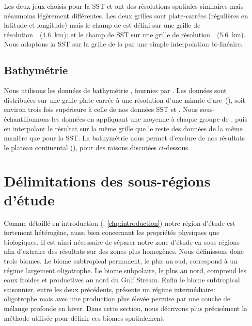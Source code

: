 Les deux jeux choisis pour la SST et  ont des résolutions spatiales similaires mais néanmoins légèrement différentes.
Les deux grilles sont plate-carrées (régulières en latitude et longitude) mais le champ de  est défini sur une grille  de résolution~~(\tapprox\qty{4.6}{\km}); et le champ de SST sur une grille  de résolution~~(\tapprox\qty{5.6}{\km}).
Nous adaptons la SST sur la grille de la  par une simple interpolation bi-linéaire.

\subsection{Bathymétrie}
\label{sec:donnees-bathymetrie}

Nous utilisons les données de bathymétrie , fournies par .
Les données sont distribuées sur une grille plate-carrée à une résolution d'une minute d'arc~(), soit environ trois fois supérieure à celle de nos données SST et .
Nous sous-échantillonnons les données en appliquant une moyenne à chaque groupe de , puis en interpolant le résultat sur la même grille que le reste des données de la même manière que pour la SST.
La bathymétrie nous permet d'exclure de nos résultats le plateau continental (), pour des raisons discutées ci-dessous.

\begin{figure}
  \centering
  \label{fig:bathymetrie}
\end{figure}

\section{Délimitations des sous-régions d'étude}
\label{sec:delimitations-regions}

Comme détaillé en introduction (, \cref*{chp:introduction}) notre région d'étude est fortement hétérogène, aussi bien concernant les propriétés physiques que biologiques.
Il est ainsi nécessaire de séparer notre zone d'étude en sous-régions afin d'extraire des résultats sur des zones plus homogènes.
Nous définissons donc trois biomes.
Le biome subtropical permanent, le plus au sud, correspond à un régime largement oligotrophe.
Le biome subpolaire, le plus au nord, comprend les eaux froides et productives au nord du Gulf Stream.
Enfin le biome subtropical saisonnier, entre les deux précédents, présente un régime intermédiaire: oligotrophe mais avec une production plus élevée permise par une couche de mélange profonde en hiver.
Dans cette section, nous décrivons plus précisément la méthode utilisée pour définir ces biomes spatialement.

